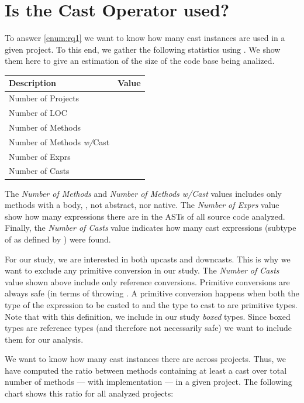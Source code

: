 \section{Is the Cast Operator used?}

\label{sec:stats}

To answer \ref{enum:rq1} we want to know how many cast instances are used in a given project.
To this end, we gather the following statistics using \ql{}.
We show them here to give an estimation of the size of the code base being analized.

\begin{center}
\begin{tabular}{lr}
	Description & Value\\
	\hline
	Number of Projects & \nproject{} \\
	Number of LOC & \nloc{} \\
	Number of Methods & \nmethod{} \\
	Number of Methods \emph{w/}Cast & \nmethodwithcast{} \\
	Number of Exprs & \nexpr{} \\
	Number of Casts & \ncast{} \\
\end{tabular}
\end{center}

The \emph{Number of Methods} and \emph{Number of Methods w/Cast} values includes only methods with a body, \ie{}, not abstract, nor native.
The \emph{Number of Exprs} value show how many expressions there are in the ASTs of all source code analyzed.
Finally, the \emph{Number of Casts} value indicates how many cast expressions (subtype of  as defined by \ql{}) were found.

For our study, we are interested in both upcasts and downcasts.
This is why we want to exclude any primitive conversion in our study.
The \emph{Number of Casts} value shown above include only reference conversions.
Primitive conversions are always safe (in terms of throwing .
A primitive conversion happens when both the type of the expression to be casted to and the type to cast to are primitive types.
Note that with this definition, we include in our study \emph{boxed} types.
Since boxed types are reference types (and therefore not necessarily safe)
we want to include them for our analysis.

We want to know how many cast instances there are across projects.
Thus, we have computed the ratio between methods containing at least a cast over total number of methods --- with implementation --- in a given project.
The following chart shows this ratio for all analyzed projects:

